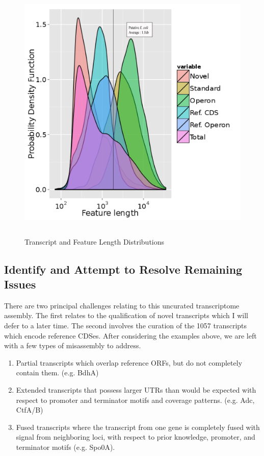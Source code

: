 \begin{figure}
\begin{center}
\includegraphics[width=\textwidth,height=5in]{images/Assembly/Summary/ffeature_length_1.png}
\end{center}

\caption{Transcript and Feature Length Distributions}\label{fig:1}

\end{figure}


%

\subsection{Identify and Attempt to Resolve Remaining Issues}
There are two principal challenges relating to this uncurated transcriptome assembly. The first relates to the qualification of novel transcripts which I will defer to a later time. The second involves the curation of the 1057 transcripts which encode reference CDSes. After considering the examples above, we are left with a few types of misassembly to address.
\begin{enumerate}
\item Partial transcripts which overlap reference ORFs, but do not completely contain them. (e.g. BdhA)
\item Extended transcripts that possess larger UTRs than would be expected with respect to promoter and terminator motifs and coverage patterns. (e.g. Adc, CtfA/B)
\item Fused transcripts where the transcript from one gene is completely fused with signal from neighboring loci, with respect to prior knowledge, promoter, and terminator motifs (e.g. Spo0A).
\end{enumerate}

